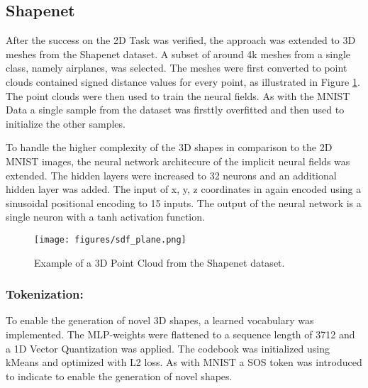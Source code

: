 \subsection*{Shapenet}

After the success on the 2D Task was verified, the approach was extended to 3D meshes from the Shapenet dataset. A subset of around 4k meshes from a single class, namely airplanes, was selected. The meshes were first converted to point clouds contained signed distance values for every point, as illustrated in Figure \ref{fig:airplane}. The point clouds were then used to train the neural fields. As with the MNIST Data a single sample from the dataset was firsttly overfitted and then used to initialize the other samples.








To handle the higher complexity of the 3D shapes in comparison to the 2D MNIST images, the neural network architecure of the implicit neural fields was extended. The hidden layers were increased to 32 neurons and an additional hidden layer was added. The input of x, y, z coordinates in again encoded using a sinusoidal positional encoding to 15 inputs. The output of the neural network is a single neuron with a tanh activation function.


\begin{figure}[H]
  \centering
  \texttt{[image: figures/sdf\_plane.png]}
  \caption{Example of a 3D Point Cloud from the Shapenet dataset.}
  \label{fig:airplane}
\end{figure}



\subsubsection*{Tokenization:}

To enable the generation of novel 3D shapes, a learned vocabulary was implemented. The MLP-weights were flattened to a sequence length of 3712 and a 1D Vector Quantization was applied. The codebook was initialized using kMeans and optimized with L2 loss. As with MNIST a SOS token was introduced to indicate to enable the generation of novel shapes.

